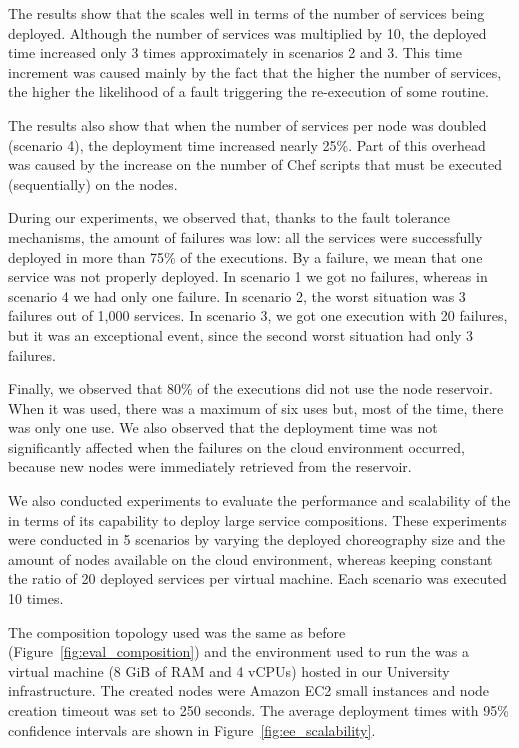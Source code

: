 The results show that the \ee scales well in terms of the number of
services being deployed. Although the number of services was
multiplied by 10, the deployed time increased only 3 times approximately
in scenarios 2 and 3.
This time increment was caused mainly by the fact that
the higher the number of services, the higher the likelihood
of a fault triggering the re-execution of some routine.

The results also show that when the number of services per node was doubled (scenario 4),
the deployment time increased nearly 25\%. Part of this overhead was caused by
the increase on the number of Chef scripts that must be executed (sequentially)
on the nodes.

During our experiments, we observed that, thanks to the \ee fault tolerance mechanisms, the amount of failures was
low: all the services were successfully deployed in more than 75\% of the executions.
By a failure, we mean that one service was not properly deployed.
In scenario 1 we got no failures, 
whereas in scenario 4 we had only one failure.
In scenario 2, the worst situation was 3 failures out of 1,000 services.
In scenario 3, we got one execution with 20 failures, but it was an exceptional event,
since the second worst situation had only 3 failures.

Finally, we observed that 80\% of the executions did not use the node reservoir.
When it was used, there was a maximum of six uses
but, most of the time, there was only one use.
We also observed that the deployment time was not significantly affected
when the failures on the cloud environment occurred,
because new nodes were immediately retrieved from the reservoir.


We also conducted experiments to evaluate the performance and scalability of
the \choreos \ee in terms of its capability to deploy large service compositions.
These experiments were conducted in 5 scenarios by varying the deployed choreography size
and the amount of nodes available on the cloud environment, whereas keeping constant the ratio of 20 deployed services per virtual machine. Each scenario was executed 10 times.

The composition topology used was the same as before (Figure~\ref{fig:eval_composition}) and
the environment used to run the \ee
was a virtual machine (8 GiB of RAM and 4 vCPUs) hosted in our University infrastructure.
The created nodes were Amazon EC2 small instances and 
node creation timeout was set to 250 seconds. 
The average deployment times with 95\% confidence intervals
are shown in Figure~\ref{fig:ee_scalability}.

